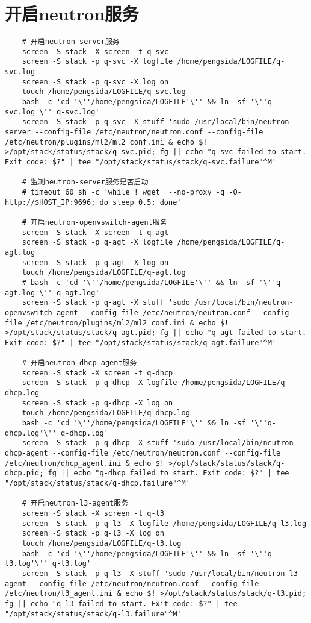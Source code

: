 \documentclass[a4paper,left=1.5cm,right=1.5cm,11pt]{article}
\begin{document}
\section{开启neutron服务}
	\begin{lstlisting}
	# 开启neutron-server服务
	screen -S stack -X screen -t q-svc
	screen -S stack -p q-svc -X logfile /home/pengsida/LOGFILE/q-svc.log
    screen -S stack -p q-svc -X log on
	touch /home/pengsida/LOGFILE/q-svc.log
    bash -c 'cd '\''/home/pengsida/LOGFILE'\'' && ln -sf '\''q-svc.log'\'' q-svc.log'
	screen -S stack -p q-svc -X stuff 'sudo /usr/local/bin/neutron-server --config-file /etc/neutron/neutron.conf --config-file /etc/neutron/plugins/ml2/ml2_conf.ini & echo $! >/opt/stack/status/stack/q-svc.pid; fg || echo "q-svc failed to start. Exit code: $?" | tee "/opt/stack/status/stack/q-svc.failure"^M'

	# 监测neutron-server服务是否启动
	# timeout 60 sh -c 'while ! wget  --no-proxy -q -O- http://$HOST_IP:9696; do sleep 0.5; done'

	# 开启neutron-openvswitch-agent服务
	screen -S stack -X screen -t q-agt
	screen -S stack -p q-agt -X logfile /home/pengsida/LOGFILE/q-agt.log
    screen -S stack -p q-agt -X log on
	touch /home/pengsida/LOGFILE/q-agt.log
    # bash -c 'cd '\''/home/pengsida/LOGFILE'\'' && ln -sf '\''q-agt.log'\'' q-agt.log'
	screen -S stack -p q-agt -X stuff 'sudo /usr/local/bin/neutron-openvswitch-agent --config-file /etc/neutron/neutron.conf --config-file /etc/neutron/plugins/ml2/ml2_conf.ini & echo $! >/opt/stack/status/stack/q-agt.pid; fg || echo "q-agt failed to start. Exit code: $?" | tee "/opt/stack/status/stack/q-agt.failure"^M'

	# 开启neutron-dhcp-agent服务
	screen -S stack -X screen -t q-dhcp
	screen -S stack -p q-dhcp -X logfile /home/pengsida/LOGFILE/q-dhcp.log
    screen -S stack -p q-dhcp -X log on
	touch /home/pengsida/LOGFILE/q-dhcp.log
    bash -c 'cd '\''/home/pengsida/LOGFILE'\'' && ln -sf '\''q-dhcp.log'\'' q-dhcp.log'
	screen -S stack -p q-dhcp -X stuff 'sudo /usr/local/bin/neutron-dhcp-agent --config-file /etc/neutron/neutron.conf --config-file /etc/neutron/dhcp_agent.ini & echo $! >/opt/stack/status/stack/q-dhcp.pid; fg || echo "q-dhcp failed to start. Exit code: $?" | tee "/opt/stack/status/stack/q-dhcp.failure"^M'

	# 开启neutron-l3-agent服务
	screen -S stack -X screen -t q-l3
	screen -S stack -p q-l3 -X logfile /home/pengsida/LOGFILE/q-l3.log
    screen -S stack -p q-l3 -X log on
	touch /home/pengsida/LOGFILE/q-l3.log
    bash -c 'cd '\''/home/pengsida/LOGFILE'\'' && ln -sf '\''q-l3.log'\'' q-l3.log'
	screen -S stack -p q-l3 -X stuff 'sudo /usr/local/bin/neutron-l3-agent --config-file /etc/neutron/neutron.conf --config-file /etc/neutron/l3_agent.ini & echo $! >/opt/stack/status/stack/q-l3.pid; fg || echo "q-l3 failed to start. Exit code: $?" | tee "/opt/stack/status/stack/q-l3.failure"^M'


\end{lstlisting}
\end{document}
